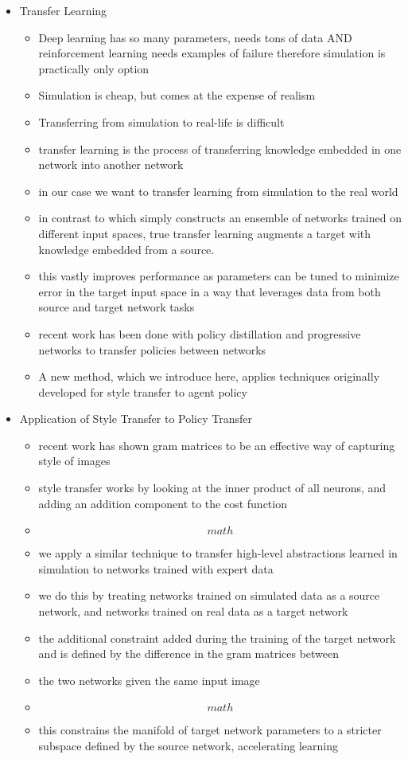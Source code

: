 \documentclass[paper=a4, fontsize=11pt]{scrartcl} %
\begin{document}
\begin{itemize}
\item Transfer Learning
	\begin{itemize}
		\item Deep learning has so many parameters, needs tons of data AND reinforcement learning needs examples of failure therefore simulation is practically only option
		\item Simulation is cheap, but comes at the expense of realism
		\item Transferring from simulation to real-life is difficult
		\item transfer learning is the process of transferring knowledge embedded in one network into another network
		\item in our case we want to transfer learning from simulation to the real world
		\item in contrast to \cite{Michels2005} which simply constructs an ensemble of networks trained on different input spaces, true transfer learning augments a target with knowledge embedded from a source.
		\item this vastly improves performance as parameters can be tuned to minimize error in the target input space in a way that leverages data from both source and target network tasks
		\item recent work has been done with policy distillation \cite{Rusu2015} and progressive networks \cite{Rusu2016} to transfer policies between networks
		\item A new method, which we introduce here, applies techniques originally developed for style transfer to agent policy~\cite{Gatys2015}
	\end{itemize}

\item Application of Style Transfer to Policy Transfer
	\begin{itemize}
		\item recent work has shown gram matrices to be an effective way of capturing style of images \cite{Gatys2015}
		\item style transfer works by looking at the inner product of all neurons, and adding an addition component to the cost function
		\item \[math\]
		\item we apply a similar technique to transfer high-level abstractions learned in simulation to networks trained with expert data
		\item we do this by treating networks trained on simulated data as a source network, and networks trained on real data as a target network
		\item the additional constraint added during the training of the target network and is defined by the difference in the gram matrices between
		\item the two networks given the same input image
		\item \[math\]
		\item this constrains the manifold of target network parameters to a stricter subspace defined by the source network, accelerating learning
	\end{itemize}
\end{itemize}
\end{document}
